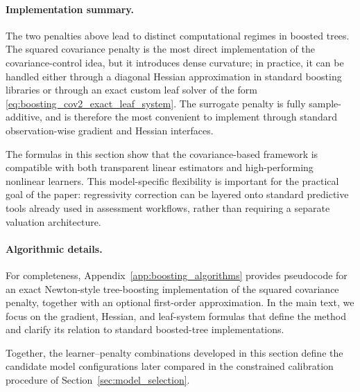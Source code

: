 \documentclass[12pt, draft]{article}
\theoremstyle{plain}
\theoremstyle{definition}
\newcommand{\1}{\mathbf{1}}
\begin{document}
{\paragraph{Implementation summary.}
The two penalties above lead to distinct computational regimes in boosted trees. The squared covariance penalty is the most direct implementation of the covariance-control idea, but it introduces dense curvature; in practice, it can be handled either through a diagonal Hessian approximation in standard boosting libraries or through an exact custom leaf solver of the form \eqref{eq:boosting_cov2_exact_leaf_system}. The surrogate penalty is fully sample-additive, and is therefore the most convenient to implement through standard observation-wise gradient and Hessian interfaces.

The formulas in this section show that the covariance-based framework is compatible with both transparent linear estimators and high-performing nonlinear learners. This model-specific flexibility is important for the practical goal of the paper: regressivity correction can be layered onto standard predictive tools already used in assessment workflows, rather than requiring a separate valuation architecture.

\paragraph{Algorithmic details.}
For completeness, Appendix~\ref{app:boosting_algorithms} provides pseudocode for an exact Newton-style tree-boosting implementation of the squared covariance penalty, together with an optional first-order approximation. In the main text, we focus on the gradient, Hessian, and leaf-system formulas that define the method and clarify its relation to standard boosted-tree implementations.

Together, the learner--penalty combinations developed in this section define the candidate model configurations later compared in the constrained calibration procedure of Section~\ref{sec:model_selection}.



}
\end{document}

